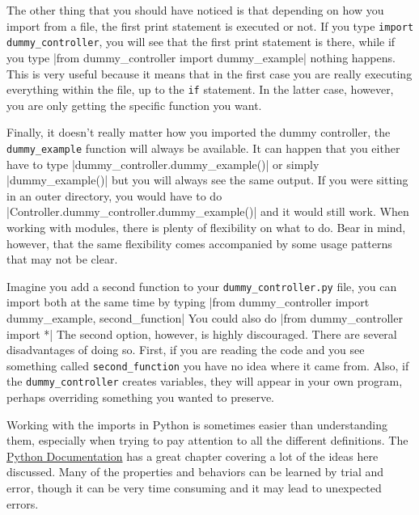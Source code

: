The other thing that you should have noticed is that depending on how
you import from a file, the first print statement is executed or not. If
you type \texttt{import dummy_controller}, you will see that the first
print statement is there, while if you type
|from dummy_controller import dummy_example| nothing
happens. This is very useful because it means that in the first case you
are really executing everything within the file, up to the \texttt{if}
statement. In the latter case, however, you are only getting the
specific function you want.

Finally, it doesn't really matter how you imported the
dummy controller, the \texttt{dummy_example} function will
always be available. It can happen that you either have to type
|dummy_controller.dummy_example()| or simply
|dummy_example()| but you will always see the same output. If
you were sitting in an outer directory, you would have to do
|Controller.dummy_controller.dummy_example()| and it would
still work. When working with modules, there is plenty of flexibility on
what to do. Bear in mind, however, that the same flexibility comes
accompanied by some usage patterns that may not be clear.

Imagine you add a second function to your \texttt{dummy_controller.py}
file, you can import both at the same time by typing
|from dummy_controller import dummy_example, second_function|
You could also do |from dummy_controller import *| The
second option, however, is highly discouraged. There are several
disadvantages of doing so. First, if you are reading the code and you
see something called \texttt{second_function} you have no idea where it
came from. Also, if the \texttt{dummy_controller} creates variables,
they will appear in your own program, perhaps overriding something you
wanted to preserve.


Working with the imports in Python is sometimes easier than
understanding them, especially when trying to pay attention to all the
different definitions. The
\href{https://docs.python.org/3.6/tutorial/modules.html}{Python
Documentation} has a great chapter covering a lot of the ideas here
discussed. Many of the properties and behaviors can be learned by trial
and error, though it can be very time consuming and it may lead to
unexpected errors.

